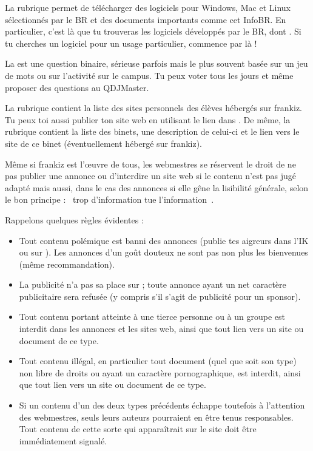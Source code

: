 La rubrique  permet de télécharger des logiciels pour
Windows, Mac et Linux sélectionnés par le BR et des documents
importants comme cet InfoBR. En particulier, c'est là que tu
trouveras les logiciels développés par le BR, dont . Si
tu cherches un logiciel pour un usage particulier, commence par là !


La  est une question binaire, sérieuse parfois mais le
plus souvent basée sur un jeu de mots ou sur l'activité sur le
campus. Tu peux voter tous les jours et même proposer des questions
au QDJMaster.

La rubrique  contient la liste des sites personnels des élèves hébergés sur frankiz. Tu peux toi aussi publier ton site web en
utilisant le lien dans . De même, la rubrique  contient la liste des binets, une description de celui-ci et le lien
vers le site de ce binet (éventuellement hébergé sur frankiz).

Même si frankiz est l'\oe uvre de tous, les webmestres se réservent le droit de ne pas publier une annonce ou d'interdire un site web si le contenu
n'est pas jugé adapté mais aussi, dans le cas des annonces si elle gêne la lisibilité générale, selon le bon principe : \guillemotleft~trop
d'information tue l'information~\guillemotright .

Rappelons quelques règles évidentes :
\begin{itemize}
 \item Tout contenu polémique est banni des annonces (publie tes aigreurs dans l'IK ou sur ).
       Les annonces d'un go\^ut douteux ne sont pas non plus les bienvenues (même recommandation).
 \item La publicité n'a pas sa place sur \fkz ; toute annonce ayant un net caractère publicitaire
       sera refusée (y compris s'il s'agit de publicité pour un sponsor).
 \item Tout contenu portant atteinte à une tierce personne ou à un groupe est interdit dans les annonces
       et les sites web, ainsi que tout lien vers un site ou document de ce type.
 \item Tout contenu illégal, en particulier tout document (quel que soit son type)
       non libre de droits ou ayant un caractère pornographique, est interdit,
       ainsi que tout lien vers un site ou document de ce type.
 \item Si un contenu d'un des deux types précédents échappe toutefois à l'attention des webmestres,
       seuls leurs auteurs pourraient en être tenus responsables.
       Tout contenu de cette sorte qui apparaîtrait sur le site doit être immédiatement signalé.
\end{itemize}


